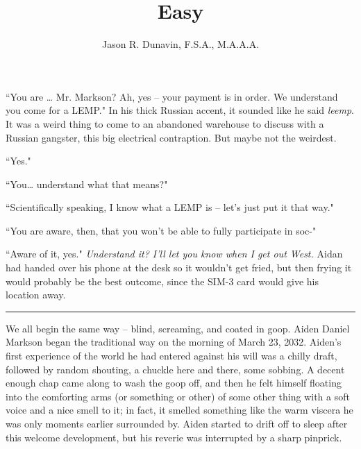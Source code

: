 \documentclass[11pt]{book}
\title{Easy}
\author{Jason R. Dunavin, F.S.A., M.A.A.A.}
\begin{document}
	\maketitle
	
	``You are … Mr. Markson? Ah, yes -- your payment is in order. We understand you come for a LEMP." In his thick Russian accent, it sounded like he said \textit{leemp}. It was a weird thing to come to an abandoned warehouse to discuss with a Russian gangster, this big electrical contraption. But maybe not the weirdest.
	
	``Yes."
	
	``You… understand what that means?"
	
	``Scientifically speaking, I know what a LEMP is – let's just put it that way."
	
	``You are aware, then, that you won't be able to fully participate in soc-"
	
	``Aware of it, yes." \textit{Understand it? I'll let you know when I get out West.} Aidan had handed over his phone at the desk so it wouldn't get fried, but then frying it would probably be the best outcome, since the SIM-3 card would give his location away.
	
	\vspace{0.5cm}
	\hrule
	\vspace{0.5cm}
	
	We all begin the same way – blind, screaming, and coated in goop. Aiden Daniel Markson began the traditional way on the morning of March 23, 2032. Aiden's first experience of the world he had entered against his will was a chilly draft, followed by random shouting, a chuckle here and there, some sobbing. A decent enough chap came along to wash the goop off, and then he felt himself floating into the comforting arms (or something or other) of some other thing with a  soft voice and a nice smell to it; in fact, it smelled something like the warm viscera he was only moments earlier surrounded by. Aiden started to drift off to sleep after this welcome development, but his reverie was interrupted by a sharp pinprick.
	
\end{document}
